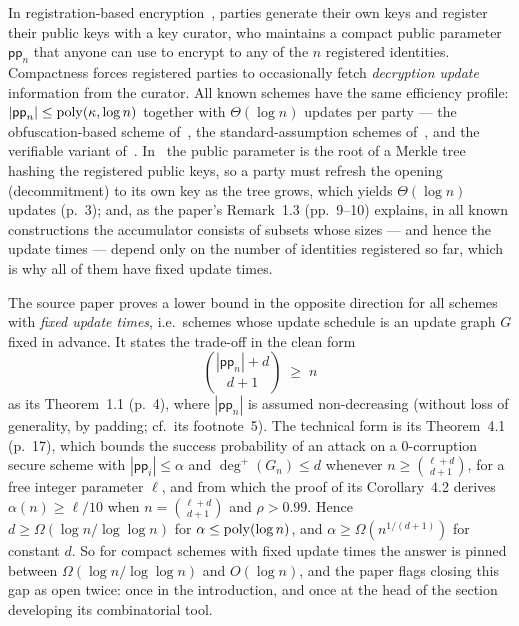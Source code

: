 \documentclass{aicr-conjecture}
\newcommand{\pp}{\mathsf{pp}}
\newcommand{\outdeg}{\deg^{+}}
\begin{document}
In registration-based encryption~\cite{GHMR18}, parties generate their
own keys and register their public keys with a key curator, who
maintains a compact public parameter $\pp_n$ that anyone can use to
encrypt to any of the $n$ registered identities. Compactness forces
registered parties to occasionally fetch \emph{decryption update}
information from the curator. All known schemes have the same efficiency
profile: $|\pp_n| \le \poly(\kappa,\log n)$ together with
$\Theta(\log n)$ updates per party --- the obfuscation-based scheme
of~\cite{GHMR18}, the standard-assumption schemes of~\cite{GHM19}, and
the verifiable variant of~\cite{GV20}. In~\cite{GHMR18} the public
parameter is the root of a Merkle tree hashing the registered public
keys, so a party must refresh the opening (decommitment) to its own key
as the tree grows, which yields $\Theta(\log n)$ updates (p.~3); and, as
the paper's Remark~1.3 (pp.~9--10) explains, in all known constructions
the accumulator consists of subsets whose sizes --- and hence the update
times --- depend only on the number of identities registered so far,
which is why all of them have fixed update times.

The source paper proves a lower bound in the opposite direction for all
schemes with \emph{fixed update times}, i.e.\ schemes whose update
schedule is an update graph $G$ fixed in advance. It states the
trade-off in the clean form
\[
  \binom{|\pp_n| + d}{\,d+1\,} \;\ge\; n
\]
as its Theorem~1.1 (p.~4), where $|\pp_n|$ is assumed non-decreasing
(without loss of generality, by padding; cf.\ its footnote~5). The
technical form is its Theorem~4.1 (p.~17), which bounds the success
probability of an attack on a $0$-corruption secure scheme with
$|\pp_i| \le \alpha$ and $\outdeg(G_n) \le d$ whenever
$n \ge \binom{\ell+d}{d+1}$, for a free integer parameter $\ell$, and
from which the proof of its Corollary~4.2 derives $\alpha(n) \ge \ell/10$
when $n = \binom{\ell+d}{d+1}$ and $\rho > 0.99$. Hence
$d \ge \Omega(\log n/\log\log n)$ for $\alpha \le \mathrm{poly}(\log n)$, and
$\alpha \ge \Omega(n^{1/(d+1)})$ for constant $d$. So for compact
schemes with fixed update times the answer is pinned between
$\Omega(\log n/\log\log n)$ and $O(\log n)$, and the paper flags closing
this gap as open twice: once in the introduction, and once at the head
of the section developing its combinatorial tool.
\end{document}
